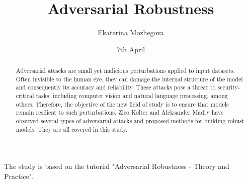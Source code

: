 \documentclass{article}
\title{Adversarial Robustness}
\author{Ekaterina Mozhegova}
\date{7th April}
\begin{document}
\maketitle

The study is based on the tutorial "Adversarial Robustness - Theory and Practice".

\begin{abstract}


  Adversarial attacks are small yet malicious perturbations applied to input datasets. Often invisible to the human eye, they can damage the internal structure of the model and 
  consequently its accuracy and reliability. These attacks pose a threat to security-critical tasks, including computer vision and natural language processing, among others.
  Therefore, the objective of the new field of study is to ensure that models remain resilient to such perturbations.  
  Zico Kolter and Aleksander Madry have observed several types of adversarial attacks and proposed methods for building robust models. They are all covered in this study. 
  
\end{abstract}

\tableofcontents
\newpage




\end{document}
